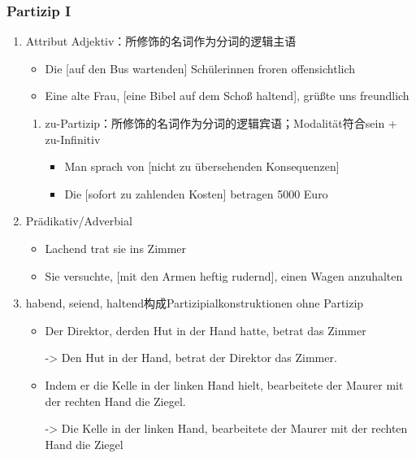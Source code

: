 \documentclass[UTF8]{report}
\begin{document}
\subsubsection{Partizip I}
\begin{enumerate}
    \item Attribut Adjektiv：所修饰的名词作为分词的逻辑主语
    \begin{itemize}
        \item Die [auf den Bus wartenden] Schülerinnen froren offensichtlich
        \item Eine alte Frau, [eine Bibel auf dem Schoß haltend], grüßte uns freundlich
    \end{itemize}
    \begin{enumerate}
        \item zu-Partizip：所修饰的名词作为分词的逻辑宾语；Modalität符合sein + zu-Infinitiv
        \begin{itemize}
            \item Man sprach von [nicht zu übersehenden Konsequenzen]
            \item Die [sofort zu zahlenden Kosten] betragen 5000 Euro
        \end{itemize}
    \end{enumerate}
    \item Prädikativ/Adverbial
    \begin{itemize}
        \item Lachend trat sie ins Zimmer
        \item Sie versuchte, [mit den Armen heftig rudernd], einen Wagen anzuhalten
    \end{itemize}
    \item habend, seiend, haltend构成Partizipialkonstruktionen ohne Partizip
    \begin{itemize}
        \item Der Direktor, derden Hut in der Hand hatte, betrat das Zimmer
        
        -> Den Hut in der Hand, betrat der Direktor das Zimmer.
        \item Indem er die Kelle in der linken Hand hielt, bearbeitete der Maurer mit der rechten Hand die Ziegel.
        
        -> Die Kelle in der linken Hand, bearbeitete der Maurer mit der rechten Hand die Ziegel
    \end{itemize}
\end{enumerate}
\end{document}
